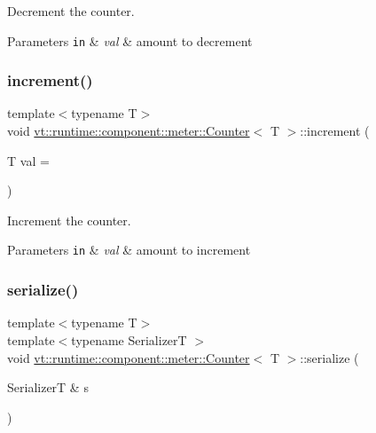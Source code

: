 Decrement the counter. 


\begin{DoxyParams}[1]{Parameters}
\mbox{\tt in}  & {\em val} & amount to decrement \\
\hline
\end{DoxyParams}
\mbox{\label{structvt_1_1runtime_1_1component_1_1meter_1_1_counter_a5bd034dd4cc31c824242ac92e6cdeaee}} 
\subsubsection{\texorpdfstring{increment()}{increment()}}
{\footnotesize\ttfamily template$<$typename T$>$ \\
void \hyperlink{structvt_1_1runtime_1_1component_1_1meter_1_1_counter}{vt\+::runtime\+::component\+::meter\+::\+Counter}$<$ T $>$\+::increment (\begin{DoxyParamCaption}\item[{T}]{val = {} }\end{DoxyParamCaption})\hspace{0.3cm}{\ttfamily [inline]}}



Increment the counter. 


\begin{DoxyParams}[1]{Parameters}
\mbox{\tt in}  & {\em val} & amount to increment \\
\hline
\end{DoxyParams}
\mbox{\label{structvt_1_1runtime_1_1component_1_1meter_1_1_counter_a4eddbf849464269e14c11baaea206df2}} 
\subsubsection{\texorpdfstring{serialize()}{serialize()}}
{\footnotesize\ttfamily template$<$typename T$>$ \\
template$<$typename SerializerT $>$ \\
void \hyperlink{structvt_1_1runtime_1_1component_1_1meter_1_1_counter}{vt\+::runtime\+::component\+::meter\+::\+Counter}$<$ T $>$\+::serialize (\begin{DoxyParamCaption}\item[{SerializerT \&}]{s }\end{DoxyParamCaption})\hspace{0.3cm}{\ttfamily [inline]}}



